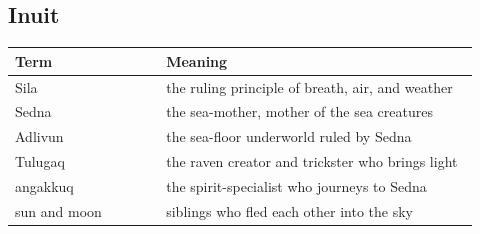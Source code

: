 \subsection{Inuit}

\begin{longtable}{L{0.30\linewidth} L{0.62\linewidth}}
\toprule
\textbf{Term} & \textbf{Meaning} \\
\midrule
\endhead
Sila & the ruling principle of breath, air, and weather \\
Sedna & the sea-mother, mother of the sea creatures \\
Adlivun & the sea-floor underworld ruled by Sedna \\
Tulugaq & the raven creator and trickster who brings light \\
angakkuq & the spirit-specialist who journeys to Sedna \\
sun and moon & siblings who fled each other into the sky \\
\bottomrule
\end{longtable}
